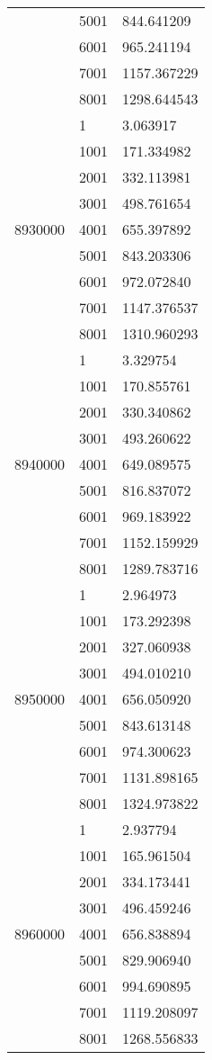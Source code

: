 \begin{table}[htb!]
\begin{tabular}{lll}
 & 5001 & 844.641209 \\
 & 6001 & 965.241194 \\
 & 7001 & 1157.367229 \\
 & 8001 & 1298.644543 \\
\multirow[c]{9}{*}{8930000} & 1 & 3.063917 \\
 & 1001 & 171.334982 \\
 & 2001 & 332.113981 \\
 & 3001 & 498.761654 \\
 & 4001 & 655.397892 \\
 & 5001 & 843.203306 \\
 & 6001 & 972.072840 \\
 & 7001 & 1147.376537 \\
 & 8001 & 1310.960293 \\
\multirow[c]{9}{*}{8940000} & 1 & 3.329754 \\
 & 1001 & 170.855761 \\
 & 2001 & 330.340862 \\
 & 3001 & 493.260622 \\
 & 4001 & 649.089575 \\
 & 5001 & 816.837072 \\
 & 6001 & 969.183922 \\
 & 7001 & 1152.159929 \\
 & 8001 & 1289.783716 \\
\multirow[c]{9}{*}{8950000} & 1 & 2.964973 \\
 & 1001 & 173.292398 \\
 & 2001 & 327.060938 \\
 & 3001 & 494.010210 \\
 & 4001 & 656.050920 \\
 & 5001 & 843.613148 \\
 & 6001 & 974.300623 \\
 & 7001 & 1131.898165 \\
 & 8001 & 1324.973822 \\
\multirow[c]{9}{*}{8960000} & 1 & 2.937794 \\
 & 1001 & 165.961504 \\
 & 2001 & 334.173441 \\
 & 3001 & 496.459246 \\
 & 4001 & 656.838894 \\
 & 5001 & 829.906940 \\
 & 6001 & 994.690895 \\
 & 7001 & 1119.208097 \\
 & 8001 & 1268.556833 \\

\end{tabular}
\end{table}
